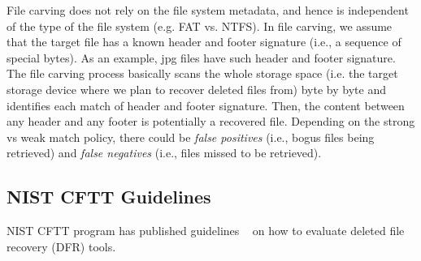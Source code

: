 File carving does not rely on the file system metadata, and hence is independent of the type of the 
file system (e.g. FAT vs. NTFS). In file carving, we assume that the target file has 
a known header and footer signature (i.e., a sequence of special bytes). As an example, 
jpg files have such header and footer signature. The file carving process basically
scans the whole storage space (i.e. the target storage device where we plan to recover deleted files from) 
byte by byte and identifies each match of header and footer signature. 
Then, the content between any header and any footer is potentially a recovered file. 
Depending on the strong vs weak match policy, there could be \emph{false positives} 
(i.e., bogus files being retrieved) 
and \emph{false negatives} (i.e., files missed to be retrieved). 

\subsection{NIST CFTT Guidelines}
NIST CFTT program has published guidelines ~\cite{meta:dfr:standards,carving_standards} on how to evaluate deleted file recovery (DFR) tools.

